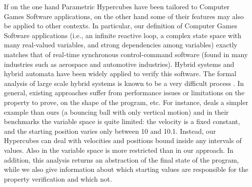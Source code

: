 
If on the one hand Parametric Hypercubes have been tailored to Computer Games Software applications, on the other hand some of their features may also be applied to other contexts. In particular, our definition of  Computer Games Software applications (i.e., an infinite reactive loop, a complex state space with many real-valued variables, and strong dependencies among variables) exactly matches that of real-time synchronous control-command software (found in many industries such as aerospace and automotive industries). Hybrid systems and hybrid automata have been widely applied to verify this software. The formal analysis of large scale hybrid systems is known to be a very difficult process \cite{AHLP00}. In general, existing approaches suffer from performance issues or limitations on the property to prove, on the shape of the program, etc. For instance, \cite{BMC12} deals a simpler example than ours (a bouncing ball with only vertical motion) and in their benchmarks the variable space is quite limited: the velocity is a fixed constant, and the starting position varies only between 10 and 10.1. Instead, our Hypercubes can deal with velocities and positions bound inside any intervals of values. Also in \cite{B09} the variable space is more restricted than in our approach. 
In addition, this analysis returns an abstraction of the final state of the program, while we also give information about which starting values are responsible for the property verification and which not.
